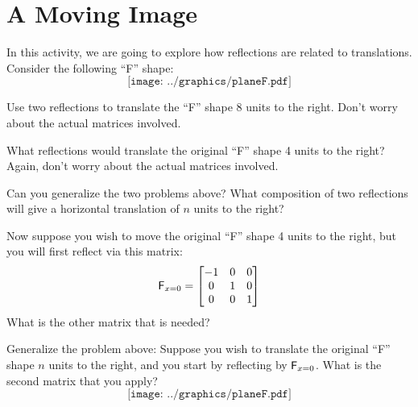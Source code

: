 \newpage
\section{A Moving Image}

In this activity, we are going to explore how reflections are related
to translations.  Consider the following ``F'' shape:
\[
\texttt{[image: ../graphics/planeF.pdf]}
\]

\begin{prob}
Use two reflections to translate the ``F'' shape 8 units to the
right. Don't worry about the actual matrices involved.
\end{prob}

\begin{prob}
What reflections would translate the original ``F'' shape 4 units to
the right? Again, don't worry about the actual matrices involved.
\end{prob}

\begin{prob}
Can you generalize the two problems above? What composition of two
reflections will give a horizontal translation of $n$ units to the
right?
\end{prob}

\begin{prob} 
Now suppose you wish to move the original ``F'' shape 4 units to the
right, but you will first reflect via this matrix:
\[
\mathsf{F}_{x=0}  = 
\begin{bmatrix}
-1 & 0 & 0 \\
0 & 1 & 0 \\
0 & 0 & 1
\end{bmatrix}
\]
What is the other matrix that is needed?
\end{prob}

\begin{prob}
Generalize the problem above: Suppose you wish to translate the
original ``F'' shape $n$ units to the right, and you start by
reflecting by $\mathsf{F}_{x=0}$. What is the second matrix that you
apply?
\[
\texttt{[image: ../graphics/planeF.pdf]}
\]
\end{prob}
